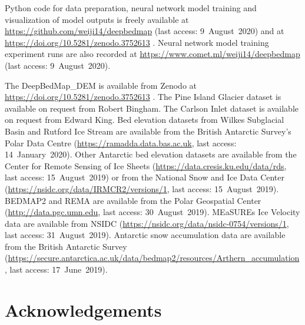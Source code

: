 Python code for data preparation, neural network model training and visualization of model outputs is freely available at \url{https://github.com/weiji14/deepbedmap} (last access: 9~August~2020) and at \url{https://doi.org/10.5281/zenodo.3752613} \citep{LeongDeepBedMap2020}.
Neural network model training experiment runs are also recorded at \url{https://www.comet.ml/weiji14/deepbedmap} (last access: 9~August~2020).

The DeepBedMap\_DEM is available from Zenodo at \url{https://doi.org/10.5281/zenodo.3752613}  \citep{LeongDeepBedMap2020}.
The Pine Island Glacier dataset \citep{BinghamDiverselandscapesPine2017} is available on request from Robert Bingham.
The Carlson Inlet dataset \citep{KingIcestreamnot2011} is available on request from Edward King.
Bed elevation datasets from Wilkes Subglacial Basin \citep{FerraccioliAirborneradarbed2018} and Rutford Ice Stream \citep{KingSubglaciallandformsRutford2016} are available from the British Antarctic Survey's Polar Data Centre (\url{https://ramadda.data.bas.ac.uk}, last access: 14~January~2020).
Other Antarctic bed elevation datasets are available from the Center for Remote Sensing of Ice Sheets (\url{https://data.cresis.ku.edu/data/rds}, last access: 15~August~2019) or from the National Snow and Ice Data Center (\url{https://nsidc.org/data/IRMCR2/versions/1}, last access: 15~August~2019).
BEDMAP2 \citep{FretwellBedmap2improvedice2013} and REMA \citep{HowatReferenceElevationModel2018} are available from the Polar Geospatial Center (\url{http://data.pgc.umn.edu}, last access: 30~August~2019).
MEaSUREs Ice Velocity data \citep{MouginotMEaSUREsPhaseMap2019} are available from NSIDC (\url{https://nsidc.org/data/nsidc-0754/versions/1}, last access: 31~August~2019).
Antarctic snow accumulation data \citep{ArthernAntarcticsnowaccumulation2006} are available from the British Antarctic Survey (\url{https://secure.antarctica.ac.uk/data/bedmap2/resources/Arthern_accumulation}, last access: 17~June~2019).



\section{Acknowledgements}

